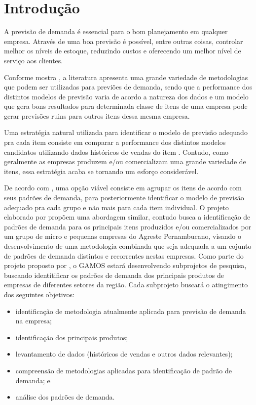 \documentclass[11pt,letterpaper,twocolumn]{article}
\begin{document}
\section{Introdução}

A previsão de demanda é essencial para o bom planejamento em qualquer empresa. Através de uma boa previsão é possível, entre outras coisas, controlar melhor os níveis de estoque, reduzindo custos e oferecendo um melhor nível de serviço aos clientes. 

Conforme mostra \cite{MakridakisHibon2000}, a literatura apresenta uma grande variedade de metodologias que podem ser utilizadas para previões de demanda, sendo que a performance dos distintos modelos de previsão varia de acordo a natureza dos dados e um modelo que gera bons resultados para determinada classe de itens de uma empresa pode gerar previsões ruins para outros itens dessa mesma empresa.

Uma estratégia natural utilizada para identificar o modelo de previsão adequado pra cada item consiste em comparar a performance dos distintos modelos candidatos utilizando dados históricos de vendas do item \citep{UlrichEtAl2022}. Contudo, como geralmente as empresas produzem e/ou comercializam uma grande variedade de itens, essa estratégia acaba se tornando um esforço considerável. 

De acordo com \cite{UlrichEtAl2022}, uma opção viável consiste em agrupar os itens de acordo com seus padrões de demanda, para posteriormente identificar o modelo de previsão adequado pra cada grupo e não mais para cada item individual. O projeto elaborado por \cite{Fraga2019} propõem uma abordagem similar, contudo busca a identificação de padrões de demanda para os principais itens produzidos e/ou comercializados por um grupo de micro e pequenas empresas do Agreste Pernambucano, visando o desenvolvimento de uma metodologia combinada que seja adequada a um cojunto de padrões de demanda distintos e recorrentes nestas empresas. Como parte do projeto proposto por \cite{Fraga2019}, o GAMOS estará desenvolvendo subprojetos de pesquisa, buscando identitificar os padrões de demanda dos principais produtos de empresas de diferentes setores da região. Cada subprojeto buscará o atingimento dos seguintes objetivos:

\begin{itemize}
  \item identificação de metodologia atualmente aplicada para previsão de demanda na empresa;
  \item identificação dos principais produtos; 
  \item levantamento de dados (históricos de vendas e outros dados relevantes);
  \item compreensão de metodologias aplicadas para identificação de padrão de demanda; e
  \item análise dos padrões de demanda.
\end{itemize}
  
\end{document}
